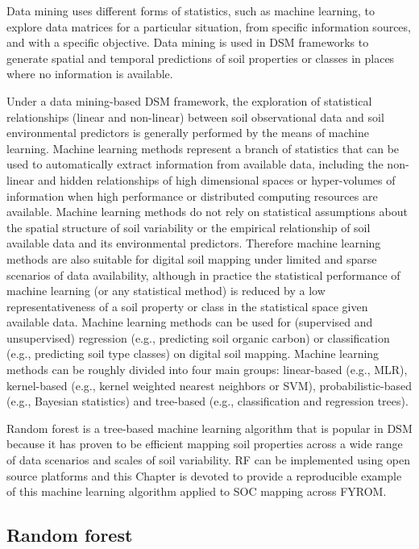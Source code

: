 \documentclass[10pt,b5paper,]{book}
\theoremstyle{definition}
\theoremstyle{definition}
\theoremstyle{definition}
\theoremstyle{remark}
\begin{document}
Data mining uses different forms of statistics, such as machine
learning, to explore data matrices for a particular situation, from
specific information sources, and with a specific objective. Data mining
is used in DSM frameworks to generate spatial and temporal predictions
of soil properties or classes in places where no information is
available.

Under a data mining-based DSM framework, the exploration of statistical
relationships (linear and non-linear) between soil observational data
and soil environmental predictors is generally performed by the means of
machine learning. Machine learning methods represent a branch of
statistics that can be used to automatically extract information from
available data, including the non-linear and hidden relationships of
high dimensional spaces or hyper-volumes of information when high
performance or distributed computing resources are available. Machine
learning methods do not rely on statistical assumptions about the
spatial structure of soil variability or the empirical relationship of
soil available data and its environmental predictors. Therefore machine
learning methods are also suitable for digital soil mapping under
limited and sparse scenarios of data availability, although in practice
the statistical performance of machine learning (or any statistical
method) is reduced by a low representativeness of a soil property or
class in the statistical space given available data. Machine learning
methods can be used for (supervised and unsupervised) regression (e.g.,
predicting soil organic carbon) or classification (e.g., predicting soil
type classes) on digital soil mapping. Machine learning methods can be
roughly divided into four main groups: linear-based (e.g., MLR),
kernel-based (e.g., kernel weighted nearest neighbors or SVM),
probabilistic-based (e.g., Bayesian statistics) and tree-based (e.g.,
classification and regression trees).

Random forest is a tree-based machine learning algorithm that is popular
in DSM because it has proven to be efficient mapping soil properties
across a wide range of data scenarios and scales of soil variability. RF
can be implemented using open source platforms and this Chapter is
devoted to provide a reproducible example of this machine learning
algorithm applied to SOC mapping across FYROM.

\hypertarget{random-forest}{%
\subsection{Random forest}\label{random-forest}}
\end{document}
